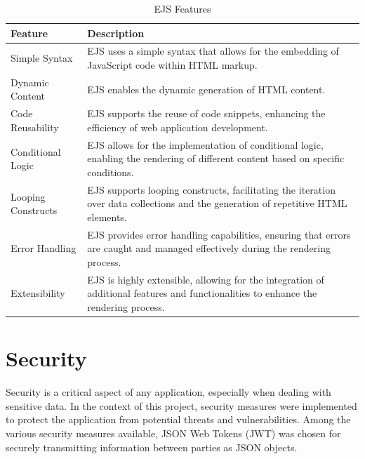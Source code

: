 \begin{table}[H]
    \centering
    \begin{tabularx}{\textwidth}{|l|X|}
        \hline
        \textbf{Feature}     & \textbf{Description}                                                                                                                              \\
        \hline
        Simple Syntax       & EJS uses a simple syntax that allows for the embedding of JavaScript code within HTML markup.                                                      \\
        \hline
        Dynamic Content     & EJS enables the dynamic generation of HTML content.                      \\
        \hline
        Code Reusability    & EJS supports the reuse of code snippets, enhancing the efficiency of web application development.                                                    \\
        \hline
        Conditional Logic   & EJS allows for the implementation of conditional logic, enabling the rendering of different content based on specific conditions.                      \\
        \hline
        Looping Constructs  & EJS supports looping constructs, facilitating the iteration over data collections and the generation of repetitive HTML elements.                      \\
        \hline
        Error Handling      & EJS provides error handling capabilities, ensuring that errors are caught and managed effectively during the rendering process.                         \\
        \hline
        Extensibility       & EJS is highly extensible, allowing for the integration of additional features and functionalities to enhance the rendering process.                      \\
        \hline
    \end{tabularx}
    \label{tab:ejs}
    \caption{EJS Features}
\end{table}

\section{Security}
Security is a critical aspect of any application, especially when dealing with sensitive data. In the context of this project, security measures were implemented 
to protect the application from potential threats and vulnerabilities. Among the various security measures available, JSON Web Tokens (JWT) was chosen for securely
transmitting information between parties as JSON objects. 

